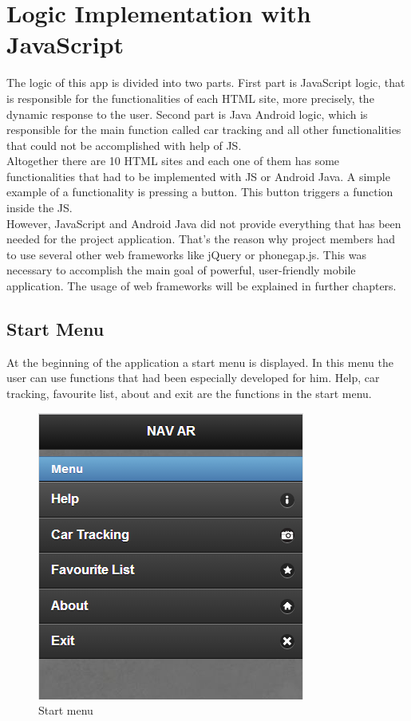 \chapter{Logic Implementation with JavaScript} \label{chapter:desgin}

The logic of this app is divided into two parts. First part is JavaScript logic, that is responsible for the functionalities of each HTML site, more precisely, the dynamic response to the user. Second part is Java Android logic, which is responsible for the main function called car tracking and all other functionalities that could not be accomplished with help of JS. 
\\

Altogether there are 10 HTML sites and each one of them has some functionalities that had to be implemented with JS or Android Java. A simple example of a functionality is pressing a button. This button triggers a function inside the JS. 
\\

However, JavaScript and Android Java did not provide everything that has been needed for the project application. That's the reason why project members had to use several other web frameworks like jQuery or phonegap.js. This was necessary to accomplish the main goal of powerful, user-friendly mobile application. The usage of web frameworks will be explained in further chapters. 

\section{Start Menu}
At the beginning of the application a start menu is displayed. In this menu the user can use functions that had been especially developed for him. Help, car tracking, favourite list, about and exit are the functions in the start menu.
\\

\begin{figure}[h]
\centering
\includegraphics[width=0.5\linewidth]{graphics/chapter4/1}
\caption{Start menu}
\label{fig:1}
\end{figure}
\newpage

